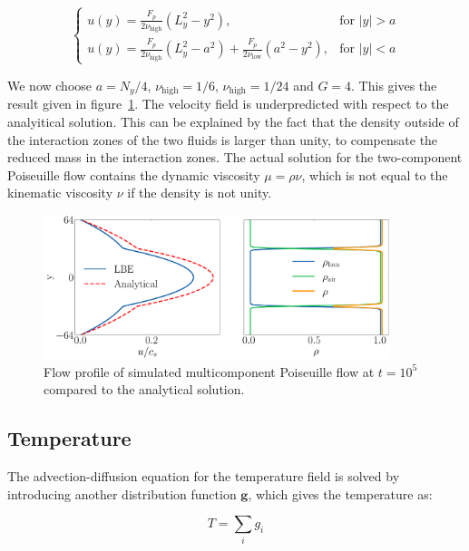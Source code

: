\begin{equation}
\begin{cases}
    u(y) = \frac{F_p}{2 \nu_{\text{high}}}\left(L_y^2 - y^2\right), & \text{for } |y| > a\\
    u(y) = \frac{F_p}{2 \nu_{\text{high}}}\left(L_y^2 - a^2\right) + \frac{F_p}{2 \nu_{\text{low}}}\left(a^2 - y^2\right), & \text{for } |y| < a
\end{cases}
\end{equation}

We now choose $a = N_y / 4$, $\nu_{\text{high}} = 1/6$, $\nu_{\text{high}} = 1/24$ and $G = 4$. This gives the result given in figure~\ref{fig:poiseuille_mc}. The velocity field is underpredicted with respect to the analyitical solution. This can be explained by the fact that the density outside of the interaction zones of the two fluids is larger than unity, to compensate the reduced mass in the interaction zones. The actual solution for the two-component Poiseuille flow contains the dynamic viscosity $\mu = \rho \nu$, which is not equal to the kinematic viscosity $\nu$ if the density is not unity. 

\begin{figure}[htp]
    \centering
    \includegraphics[width=0.9\textwidth]{figures/poiseuille_mc.pdf}
    \caption{Flow profile of simulated multicomponent Poiseuille flow at $t=10^5$ compared to the analytical solution.}\label{fig:poiseuille_mc}
\end{figure}

\subsection{Temperature}
The advection-diffusion equation for the temperature field is solved by introducing another distribution function $\bm{g}$, which gives the temperature as:

\begin{equation}
    T = \sum_i g_i
\end{equation}

